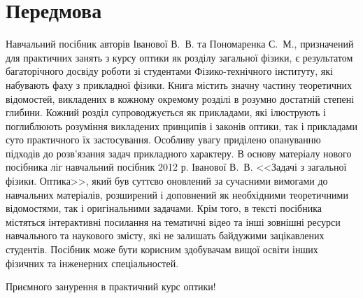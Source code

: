 
\introtrue
\chapter*{Передмова}


Навчальний посібник авторів Іванової В.~В. та Пономаренка С.~М., призначений для практичних занять з курсу оптики як розділу загальної фізики, є результатом багаторічного досвіду роботи зі студентами Фізико-технічного інституту, які набувають фаху з прикладної фізики. Книга містить значну частину теоретичних відомостей, викладених в кожному окремому розділі в розумно достатній степені глибини. Кожний розділ супроводжується як прикладами, які ілюструють і поглиблюють розуміння викладених принципів і законів оптики, так і прикладами суто практичного їх застосування. Особливу увагу приділено опануванню підходів до розв’язання задач прикладного характеру. В  основу матеріалу нового посібника ліг навчальний посібник 2012 р. Іванової В.~В. <<Задачі з загальної фізики. Оптика>>, який був суттєво оновлений за сучасними вимогами до навчальних матеріалів, розширений і доповнений як необхідними теоретичними відомостями, так і оригінальними задачами. Крім того, в тексті посібника містяться інтерактивні посилання на тематичні відео та інші зовнішні ресурси навчального та наукового змісту, які не залишать байдужими зацікавлених студентів. Посібник може бути корисним здобувачам вищої освіти інших фізичних та інженерних спеціальностей.

Приємного занурення в практичний курс оптики!
%
\introfalse





